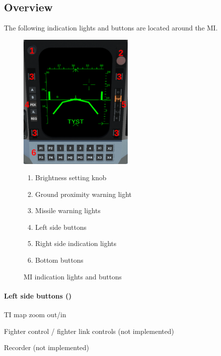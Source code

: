 \subsection{Overview}
\label{sec:mi-overview}
The following indication lights and buttons are located around the MI.
\begin{figure}[!ht]
  \centering
  \includegraphics[width=0.5\textwidth]{images/displays/MI-overview.png}

  \begin{multicols}{2}
    \begin{enumerate}[nosep]
      \item \label{item:brightness} Brightness setting knob
      \item \label{item:gpw} Ground proximity warning light
      \item \label{item:mlw} Missile warning lights
      \item \label{item:buttons} Left side buttons
      \item \label{item:lights} Right side indication lights
      \item \label{item:bot-buttons} Bottom buttons
    \end{enumerate}
  \end{multicols}

  \caption{MI indication lights and buttons}
  \label{fig:mi}
\end{figure}

\paragraph{Left side buttons ()}
\begin{description}[nosep]
  \item[A/B] TI map zoom out/in
  \item[PEK/JL] Fighter control / fighter link controls (not implemented)
  \item[REG] Recorder (not implemented)
\end{description}

